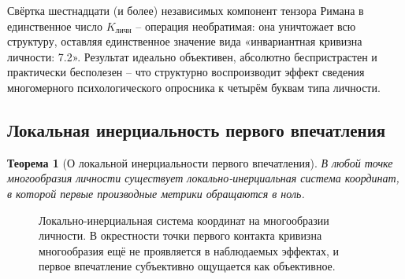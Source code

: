 \documentclass[11pt,a4paper]{article}
\newtheorem{theorem}{Теорема}
\begin{document}
Свёртка шестнадцати (и более) независимых компонент тензора Римана в единственное число $K_{\text{личн}}$ -- операция необратимая: она уничтожает всю структуру, оставляя единственное значение вида «инвариантная кривизна личности: 7.2». Результат идеально объективен, абсолютно беспристрастен и практически бесполезен -- что структурно воспроизводит эффект сведения многомерного психологического опросника к четырём буквам типа личности.

\subsection{Локальная инерциальность первого впечатления}

\begin{theorem}[О локальной инерциальности первого впечатления]
В любой точке многообразия личности существует локально-инерциальная система координат, в которой первые производные метрики обращаются в ноль.
\end{theorem}

\begin{figure}[htbp]
\centering
{}
\caption{Локально-инерциальная система координат на многообразии личности. В окрестности точки первого контакта кривизна многообразия ещё не проявляется в наблюдаемых эффектах, и первое впечатление субъективно ощущается как объективное.}
\label{fig:inertial}
\end{figure}
\end{document}
